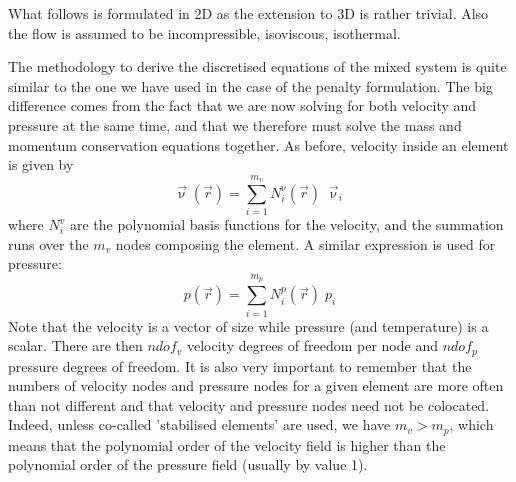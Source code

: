 \label{sec_mixed}

What follows is formulated in 2D as the extension to 3D is 
rather trivial. Also the flow is assumed to be incompressible, 
isoviscous, isothermal. 

The methodology to derive the discretised equations of the mixed system is 
quite similar to the one we have used in the case of the penalty formulation.
The big difference comes from the fact that we are now solving for both 
velocity and pressure at the same time, and that we therefore must solve 
the mass and momentum conservation equations together.
As before, velocity inside an element is given by 
\begin{equation}
{\vec \upnu}({\vec r})=\sum_{i=1}^{m_v} N_i^\upnu({\vec r})\;  {\vec \upnu}_i
\label{mixed01}
\end{equation}
where $N_i^{v}$ are the polynomial basis functions for the velocity,
and the summation runs over the $m_v$ nodes composing the element.
A similar expression is used for pressure:
\begin{equation}
p({\vec r})=\sum_{i=1}^{m_p} N_i^p({\vec r}) \; p_i
\label{mixed02}
\end{equation}
Note that the velocity is a vector of size while pressure (and temperature)
is a scalar. There are then $ndof_v$ velocity degrees of freedom per node
and $ndof_p$ pressure degrees of freedom.
It is also very important to remember that the numbers of 
velocity nodes and pressure nodes for a given element 
are more often than not different and that velocity and pressure
nodes need not be colocated. Indeed, unless 
co-called 'stabilised elements' are used, we have $m_v>m_p$, which 
means that the polynomial order of the velocity field is higher than 
the polynomial order of the pressure field (usually by value 1).


